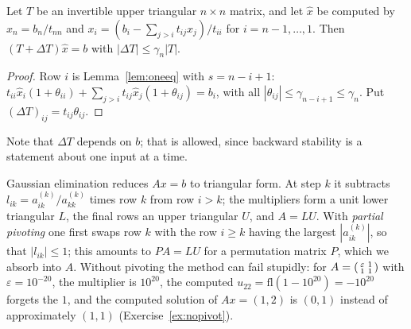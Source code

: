 \begin{theorem}\label{thm:backsub}
Let $T$ be an invertible upper triangular $n\times n$ matrix, and let $\hat x$ be computed by $x_n=b_n/t_{nn}$ and
$x_i=(b_i-\sum_{j>i}t_{ij}x_j)/t_{ii}$ for $i=n-1,\dots,1$. Then $(T+\Delta T)\hat x=b$ with $|\Delta T|\le\gamma_n|T|$.
\end{theorem}
\begin{proof}
Row $i$ is Lemma~\ref{lem:oneeq} with $s=n-i+1$: $t_{ii}\hat x_i(1+\theta_{ii})+\sum_{j>i}t_{ij}\hat x_j(1+\theta_{ij})=b_i$, with all
$|\theta_{ij}|\le\gamma_{n-i+1}\le\gamma_n$. Put $(\Delta T)_{ij}=t_{ij}\theta_{ij}$.
\end{proof}

Note that $\Delta T$ depends on $b$; that is allowed, since backward stability is a statement about one input at a time.

Gaussian elimination reduces $Ax=b$ to triangular form. At step $k$ it subtracts $l_{ik}=a^{(k)}_{ik}/a^{(k)}_{kk}$ times row $k$ from row $i>k$; the
multipliers form a unit lower triangular $L$, the final rows an upper triangular $U$, and $A=LU$. With \emph{partial pivoting} one first swaps row $k$
with the row $i\ge k$ having the largest $|a^{(k)}_{ik}|$, so that $|l_{ik}|\le1$; this amounts to $PA=LU$ for a permutation matrix $P$, which we absorb
into $A$. Without pivoting the method can fail stupidly: for $A=\begin{psmallmatrix}\varepsilon&1\\1&1\end{psmallmatrix}$ with $\varepsilon=10^{-20}$, the
multiplier is $10^{20}$, the computed $u_{22}=\mathrm{fl}(1-10^{20})=-10^{20}$ forgets the $1$, and the computed solution of $Ax=(1,2)$ is $(0,1)$ instead
of approximately $(1,1)$ (Exercise~\ref{ex:nopivot}).

